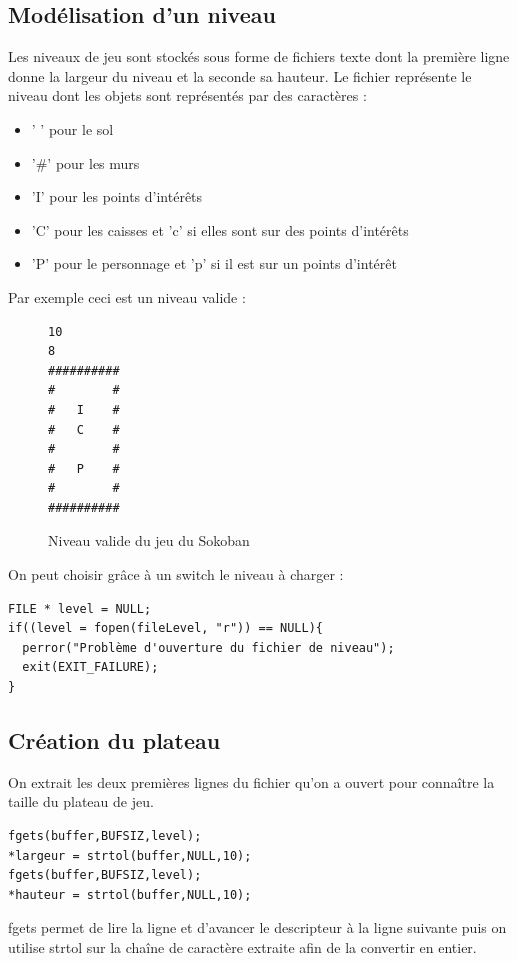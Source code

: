 \documentclass{article}
\begin{document}
\subsection{Modélisation d'un niveau}

Les niveaux de jeu sont stockés sous forme de fichiers texte dont la première ligne donne la largeur du niveau et la seconde sa hauteur.
Le fichier représente le niveau dont les objets sont représentés par des caractères :
\begin{itemize}
  \item ' ' pour le sol
  \item '\#' pour les murs
  \item 'I' pour les points d'intérêts
  \item 'C' pour les caisses et 'c' si elles sont sur des points d'intérêts
  \item 'P' pour le personnage et 'p' si il est sur un points d'intérêt
\end{itemize}

Par exemple ceci est un niveau valide :

\begin{figure}[H]
  \begin{BVerbatim}
10
8
##########
#        #
#   I    #
#   C    #
#        #
#   P    #
#        #
##########
  \end{BVerbatim}
\caption{Niveau valide du jeu du Sokoban}
\end{figure}

On peut choisir grâce à un switch le niveau à charger :

\begin{verbatim}
FILE * level = NULL;
if((level = fopen(fileLevel, "r")) == NULL){
  perror("Problème d'ouverture du fichier de niveau");
  exit(EXIT_FAILURE);
}
\end{verbatim}

\subsection{Création du plateau}

On extrait les deux premières lignes du fichier qu'on a ouvert pour connaître la taille du plateau de jeu.

\begin{verbatim}
fgets(buffer,BUFSIZ,level);
*largeur = strtol(buffer,NULL,10);
fgets(buffer,BUFSIZ,level);
*hauteur = strtol(buffer,NULL,10);
\end{verbatim}

fgets permet de lire la ligne et d'avancer le descripteur à la ligne suivante puis on utilise strtol sur la chaîne de caractère extraite afin de la convertir en entier.
\\
\end{document}
